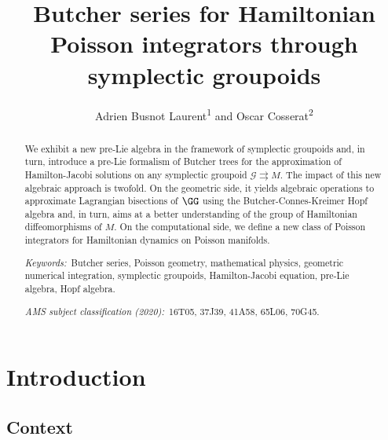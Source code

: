 \documentclass[a4paper,11pt]{article}
\title{
Butcher series for Hamiltonian Poisson integrators through symplectic groupoids
}
\author{
Adrien Busnot Laurent\textsuperscript{1} and Oscar Cosserat\textsuperscript{2}
}
\date{\vspace{-1cm}}
\newcommand{\groupoid}{\mathcal{G} \rightrightarrows M}
\begin{document}

\maketitle

\begin{abstract}

We exhibit a new pre-Lie algebra in the framework of symplectic groupoids and, in turn, introduce a pre-Lie formalism of Butcher trees for the approximation of Hamilton-Jacobi solutions on any symplectic groupoid $\groupoid.$ The impact of this new algebraic approach is twofold. On the geometric side, it yields algebraic operations to approximate Lagrangian bisections of $\GG$ using the Butcher-Connes-Kreimer Hopf algebra and, in turn, aims at a better understanding of the group of Hamiltonian diffeomorphisms of $M.$ On the computational side, we define a new class of Poisson integrators for Hamiltonian dynamics on Poisson manifolds.


\smallskip

\noindent
{\it Keywords:\,} Butcher series, Poisson geometry, mathematical physics, geometric numerical integration, symplectic groupoids, Hamilton-Jacobi equation, pre-Lie algebra, Hopf algebra.

\smallskip

\noindent
{\it AMS subject classification (2020):\,} 16T05, 37J39, 41A58, 65L06, 70G45.
\end{abstract}



\section{Introduction}

\subsection{Context}
\end{document}

